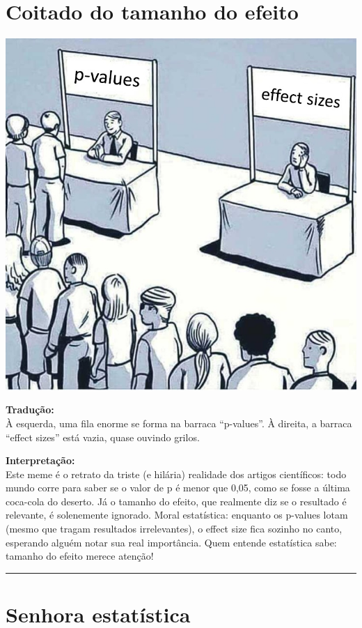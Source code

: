\documentclass[
]{book}
\begin{document}
\section{Coitado do tamanho do efeito}\label{coitado-do-tamanho-do-efeito}

\includegraphics{p-value9.jpg}

\textbf{Tradução:}\\
À esquerda, uma fila enorme se forma na barraca ``p-values''. À direita, a barraca ``effect sizes'' está vazia, quase ouvindo grilos.

\textbf{Interpretação:}\\
Este meme é o retrato da triste (e hilária) realidade dos artigos científicos: todo mundo corre para saber se o valor de p é menor que 0,05, como se fosse a última coca-cola do deserto. Já o tamanho do efeito, que realmente diz se o resultado é relevante, é solenemente ignorado. Moral estatística: enquanto os p-values lotam (mesmo que tragam resultados irrelevantes), o effect size fica sozinho no canto, esperando alguém notar sua real importância. Quem entende estatística sabe: tamanho do efeito merece atenção!

\begin{center}\rule{0.5\linewidth}{0.5pt}\end{center}

\section{Senhora estatística}\label{senhora-estatuxedstica}
\end{document}
